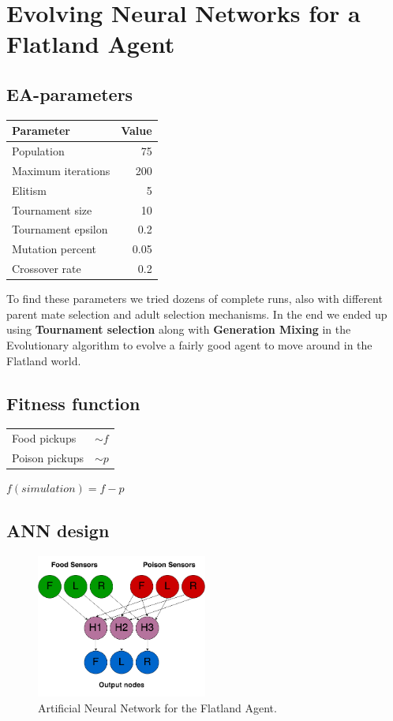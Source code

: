 \section{Evolving Neural Networks for a Flatland Agent}
\subsection{EA-parameters}
\begin{center}

\begin{tabular}{p{5cm} | r}
\textbf{Parameter} & \textbf{Value} \\
\hline
Population & 75 \\
Maximum iterations & 200 \\
Elitism & 5 \\
Tournament size & 10 \\
Tournament epsilon & 0.2 \\
Mutation percent & 0.05 \\
Crossover rate & 0.2 \\
\hline
\end{tabular}
\end{center}

To find these parameters we tried dozens of complete runs, also with different parent mate selection and adult selection mechanisms. In the end we ended up using \textbf{Tournament selection} along with \textbf{Generation Mixing} in the Evolutionary algorithm to evolve a fairly good agent to move around in the Flatland world.

\subsection{Fitness function}
\begin{tabular}{l l}
Food pickups & $\sim f$ \\
Poison pickups & $\sim p$ \\
\end{tabular}

$f(simulation) = f - p$

\subsection{ANN design}

\begin{figure}[H]
  \centering
    \includegraphics[width=0.5\textwidth]{img/Flatland_network}
    \caption{Artificial Neural Network for the Flatland Agent.}
\end{figure}

